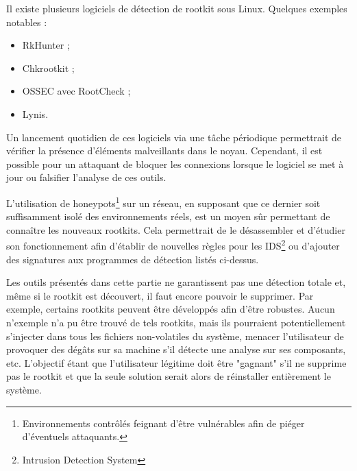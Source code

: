 \documentclass[12pt]{article}
\begin{document}
    Il existe plusieurs logiciels de détection de rootkit sous Linux. Quelques exemples notables :
    \begin{itemize}
    	\item RkHunter\cite{rkhunter} ;
    	\item Chkrootkit\cite{chrootkit} ;
    	\item OSSEC avec RootCheck\cite{rootcheck} ;
    	\item Lynis\cite{lynis}.
    \end{itemize}
    
    Un lancement quotidien de ces logiciels via une tâche périodique permettrait de vérifier la présence d'éléments malveillants dans le noyau. Cependant, il est possible pour un attaquant de bloquer les connexions lorsque le logiciel se met à jour ou falsifier l'analyse de ces outils.
    
    
    L'utilisation de honeypots\footnote{Environnements contrôlés feignant d'être vulnérables afin de piéger d'éventuels attaquants.} sur un réseau, en supposant que ce dernier soit suffisamment isolé des environnements réels, est un moyen sûr permettant de connaître les nouveaux rootkits. Cela permettrait de le désassembler et d'étudier son fonctionnement afin d'établir de nouvelles règles pour les IDS\footnote{Intrusion Detection System} ou d'ajouter des signatures aux programmes de détection listés ci-dessus.
   
    Les outils présentés dans cette partie ne garantissent pas une détection totale et, même si le rootkit est découvert, il faut encore pouvoir le supprimer. Par exemple, certains rootkits peuvent être développés afin d'être robustes. Aucun n'exemple n'a pu être trouvé de tels rootkits, mais ils pourraient potentiellement s'injecter dans tous les fichiers non-volatiles du système, menacer l'utilisateur de provoquer des dégâts sur sa machine s'il détecte une analyse sur ses composants, etc. L'objectif étant que l'utilisateur légitime doit être "gagnant" s'il ne supprime pas le rootkit et que la seule solution serait alors de réinstaller entièrement le système.
    
\end{document}
